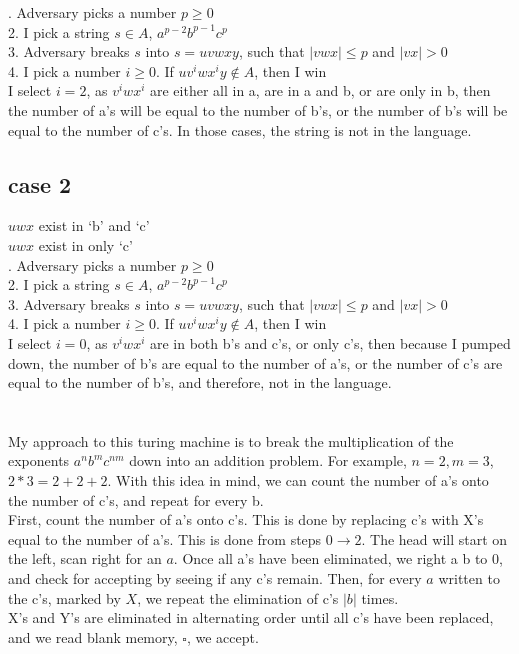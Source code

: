 \documentclass[10pt,letterpaper]{article}
\begin{document}
. Adversary picks a number $p \geq 0$\\
2. I pick a string $s \in A$, $a^{p-2}b^{p-1}c^p$ \\
3. Adversary breaks $s$ into $s = uvwxy$, such that $|vwx| \leq p$ and $|vx| > 0$\\
4. I pick a number $i \geq 0$. If $uv^iwx^iy \notin A$, then I win\\

I select $i=2$, as $v^iwx^i$ are either all in a, are in a and b, or are only 
in b, then the number of a's will be equal to the number of b's, or the number
of b's will be equal to the number of c's. In those cases, the string is not
in the language.

\subsection*{case 2}
$uwx$ exist in `b' and `c'\\
$uwx$ exist in only `c'\\

. Adversary picks a number $p \geq 0$\\
2. I pick a string $s \in A$, $a^{p-2}b^{p-1}c^p$ \\
3. Adversary breaks $s$ into $s = uvwxy$, such that $|vwx| \leq p$ and $|vx| > 0$\\
4. I pick a number $i \geq 0$. If $uv^iwx^iy \notin A$, then I win\\

I select $i=0$, as $v^iwx^i$ are in both b's and c's, or only c's, then because
I pumped down, the number of b's are equal to the number of a's, or the number
of c's are equal to the number of b's, and therefore, not in the language.

\section{}
My approach to this turing machine is to break the multiplication of the exponents
$a^nb^mc^{nm}$ down into an addition problem. For example, $n=2, m=3$, $2*3=2+2+2$.
With this idea in mind, we can count the number of a's onto the number of c's, and
repeat for every b.\\
First, count the number of a's onto c's. This is done by replacing c's
with X's equal to the number of a's. This is done from steps $0 \rightarrow 2$.
The head will start on the left, scan right for an $a$. Once all a's have been eliminated,
we right a b to $0$, and check for accepting by seeing if any c's remain. Then, for every
$a$ written to the c's, marked by $X$, we repeat the elimination of c's $|b|$ times.\\
X's and Y's are eliminated in alternating order until all c's have been replaced, and we 
read blank memory, $\square$, we accept. 
\end{document}
